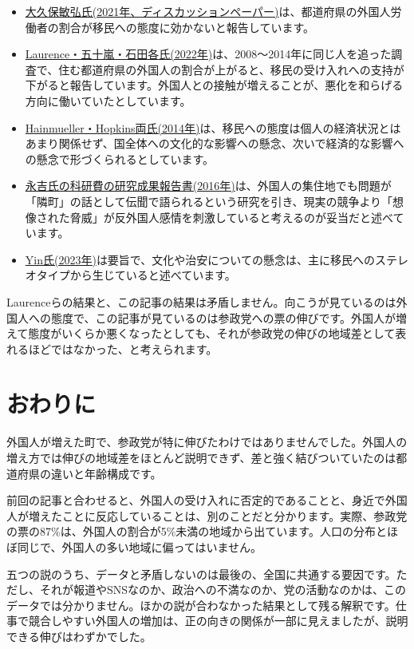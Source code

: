 \documentclass[a4paper,11pt]{ltjsarticle}
\begin{document}
\begin{itemize}[nosep]
\item \href{https://ies.keio.ac.jp/upload/DP2021-005EN.pdf}{大久保敏弘氏(2021年、ディスカッションペーパー)}は、都道府県の外国人労働者の割合が移民への態度に効かないと報告しています。
\item \href{https://doi.org/10.1093/sf/soab115}{Laurence・五十嵐・石田各氏(2022年)}は、2008〜2014年に同じ人を追った調査で、住む都道府県の外国人の割合が上がると、移民の受け入れへの支持が下がると報告しています。外国人との接触が増えることが、悪化を和らげる方向に働いていたとしています。
\item \href{https://j-hai.github.io/assets/pdf/annualrev-imig-attitudes.pdf}{Hainmueller・Hopkins両氏(2014年)}は、移民への態度は個人の経済状況とはあまり関係せず、国全体への文化的な影響への懸念、次いで経済的な影響への懸念で形づくられるとしています。
\item \href{https://kaken.nii.ac.jp/file/KAKENHI-PROJECT-25780305/25780305seika.pdf}{永吉氏の科研費の研究成果報告書(2016年)}は、外国人の集住地でも問題が「隣町」の話として伝聞で語られるという研究を引き、現実の競争より「想像された脅威」が反外国人感情を刺激していると考えるのが妥当だと述べています。
\item \href{https://doi.org/10.1525/as.2023.1922764}{Yin氏(2023年)}は要旨で、文化や治安についての懸念は、主に移民へのステレオタイプから生じていると述べています。
\end{itemize}

Laurenceらの結果と、この記事の結果は矛盾しません。向こうが見ているのは外国人への態度で、この記事が見ているのは参政党への票の伸びです。外国人が増えて態度がいくらか悪くなったとしても、それが参政党の伸びの地域差として表れるほどではなかった、と考えられます。

\section*{おわりに}

外国人が増えた町で、参政党が特に伸びたわけではありませんでした。外国人の増え方では伸びの地域差をほとんど説明できず、差と強く結びついていたのは都道府県の違いと年齢構成です。

前回の記事と合わせると、外国人の受け入れに否定的であることと、身近で外国人が増えたことに反応していることは、別のことだと分かります。実際、参政党の票の87\%は、外国人の割合が5\%未満の地域から出ています。人口の分布とほぼ同じで、外国人の多い地域に偏ってはいません。

五つの説のうち、データと矛盾しないのは最後の、全国に共通する要因です。ただし、それが報道やSNSなのか、政治への不満なのか、党の活動なのかは、このデータでは分かりません。ほかの説が合わなかった結果として残る解釈です。仕事で競合しやすい外国人の増加は、正の向きの関係が一部に見えましたが、説明できる伸びはわずかでした。
\end{document}
